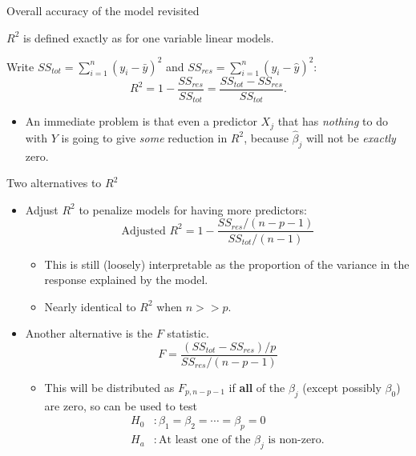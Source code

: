 \documentclass[
  ignorenonframetext,
]{beamer}
\providecommand{\tightlist}{%
  \setlength{\itemsep}{0pt}\setlength{\parskip}{0pt}}
\begin{document}
\begin{frame}{Overall accuracy of the model revisited}
\protect\hypertarget{overall-accuracy-of-the-model-revisited}{}

\(R^2\) is defined exactly as for one variable linear models.

Write \(SS_{tot}=\sum_{i=1}^n(y_i-\bar y)^2\) and
\(SS_{res}=\sum_{i=1}^n(y_i-\hat y)^2\): \[
R^2 = 1 - \frac{SS_{res}}{SS_{tot}}=\frac{SS_{tot}-SS_{res}}{SS_{tot}}.
\]

\begin{itemize}
\tightlist
\item
  An immediate problem is that even a predictor \(X_j\) that has
  \emph{nothing} to do with \(Y\) is going to give \emph{some} reduction
  in \(R^2\), because \(\hat\beta_j\) will not be \emph{exactly} zero.
\end{itemize}

\end{frame}

\begin{frame}{Two alternatives to \(R^2\)}
\protect\hypertarget{two-alternatives-to-r2}{}

\begin{itemize}
\tightlist
\item
  Adjust \(R^2\) to penalize models for having more predictors: \[
  \text{Adjusted } R^2 = 1 - \frac{SS_{res}/(n-p-1)}{SS_{tot}/(n-1)}
  \]

  \begin{itemize}
  \tightlist
  \item
    This is still (loosely) interpretable as the proportion of the
    variance in the response explained by the model.
  \item
    Nearly identical to \(R^2\) when \(n>>p\).
  \end{itemize}
\item
  Another alternative is the \(F\) statistic. \[
  F = \frac{(SS_{tot}-SS_{res})/p}{SS_{res}/(n-p-1)}
  \]

  \begin{itemize}
  \tightlist
  \item
    This will be distributed as \(F_{p,n-p-1}\) if \textbf{all} of the
    \(\beta_j\) (except possibly \(\beta_0\)) are zero, so can be used
    to test \begin{align*}
      H_0 &: \beta_1=\beta_2=\cdots=\beta_p=0 \\
      H_a &: \text{At least one of the $\beta_j$ is non-zero.}
      \end{align*}
  \end{itemize}
\end{itemize}

\end{frame}
\end{document}
